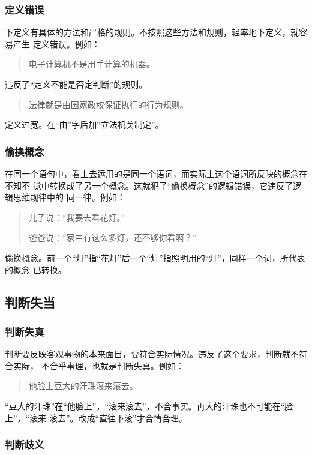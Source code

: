 \documentclass[final,oneside]{ctexbook}
\newenvironment{equotation}{\begin{quotation}\kaishu}{\end{quotation}}
\begin{document}
\subsubsection{定义错误}

下定义有具体的方法和严格的规则。不按照这些方法和规则，轻率地下定义，就容易产生
定义错误。例如：
\begin{equotation}
  电子计算机不是用手计算的机器。
\end{equotation}
违反了“定义不能是否定判断”的规则。

\begin{equotation}
  法律就是由国家政权保证执行的行为规则。
\end{equotation}
定义过宽。在“由”字后加“立法机关制定”。

\subsubsection{偷换概念}

在同一个语句中，看上去运用的是同一个语词，而实际上这个语词所反映的概念在不知不
觉中转换成了另一个概念。这就犯了“偷换概念”的逻辑错误，它违反了逻辑思维规律中的
同一律。例如：
\begin{equotation}
  儿子说：“我要去看花灯。”

  爸爸说：“家中有这么多灯，还不够你看啊？”
\end{equotation}
偷换概念。前一个“灯”指“花灯”后一个“灯”指照明用的“灯”，同样一个词，所代表的概念
已转换。

\subsection{判断失当}

\subsubsection{判断失真}

判断要反映客观事物的本来面目，要符合实际情况。违反了这个要求，判断就不符合实际，
不合乎事理，也就是判断失真。例如：
\begin{equotation}
  他脸上豆大的汗珠滚来滚去。
\end{equotation}
“豆大的汗珠”在“他脸上”，“滚来滚去”，不合事实。再大的汗珠也不可能在“脸上”，“滚来
滚去”。改成“直往下滚”才合情合理。

\subsubsection{判断歧义}
\end{document}
